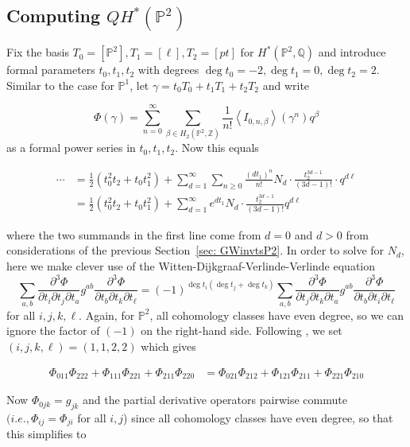 \documentclass{amsart}
\newcommand{\PP}{\mathbb{P}}\newcommand{\A}{\mathbb{A}}\newcommand{\Z}{\mathbb{Z}}\newcommand{\C}{\mathbb{C}}\newcommand{\N}{\mathbb{N}}\newcommand{\T}{\mathbb{T}}
\newcommand{\Q}{\mathbb{Q}}
\begin{document}





     
\subsection{Computing $QH^*(\PP^2)$}
\label{sec: 4.5}
Fix the basis $T_0 = [\PP^2], T_1=[\ell], T_2=[pt]$ for $H^*(\PP^2, \Q)$ and introduce formal parameters $t_0, t_1, t_2$ with degrees $\deg t_0 = -2, \deg t_1 = 0, \deg t_2 = 2$. Similar to the case for $\PP^1$, let $\gamma = t_0T_0 + t_1T_1 + t_2T_2$ and write

\[ \Phi(\gamma) = \sum_{n=0}^\infty \sum_{\beta\in H_2(\PP^2,\Z)} \frac{1}{n!} \left<I_{0,n,\beta}\right>(\gamma^n) q^\beta \] as a formal power series in $t_0, t_1, t_2$. Now this equals

\begin{align*}
\cdots &= \frac{1}{2}( t_0^2 t_2 + t_0 t_1^2 ) + \sum_{d=1}^\infty \sum_{n\geq 0} \frac{(dt_1)^n}{n!} N_d \cdot \frac{t_2^{3d-1}}{(3d-1)!} \cdot q^{d\ell}\\
&= \frac{1}{2}( t_0^2 t_2 + t_0 t_1^2 ) + \sum_{d=1}^\infty e^{dt_1} N_d \cdot \frac{ t_2^{3d-1}}{(3d-1)!}q^{d\ell} \end{align*} 

where the two summands in the first line come from $d=0$ and $d>0$ from considerations of the previous Section~\ref{sec: GWinvtsP2}. In order to solve for $N_d$, here we make clever use of the Witten-Dijkgraaf-Verlinde-Verlinde equation \[ \sum_{a,b} \frac{ \partial^3 \Phi}{\partial t_i \partial t_j \partial t_a} g^{ab} \frac{ \partial^3 \Phi }{\partial t_b \partial t_k \partial t_\ell} = (-1)^{\deg t_i (\deg t_j + \deg t_k)} \sum_{a,b} \frac{ \partial^3 \Phi}{\partial t_j \partial t_k \partial t_a} g^{ab} \frac{ \partial^3 \Phi}{\partial t_b \partial t_i \partial t_\ell} \] for all $i,j,k,\ell$. Again, for $\PP^2$, all cohomology classes have even degree, so we can ignore the factor of $(-1)$ on the right-hand side. Following \cite{coxkatxMSAG}, we set $(i,j,k,\ell) = (1,1,2,2)$ which gives

\begin{align*}
    \Phi_{011}\Phi_{222} + \Phi_{111}\Phi_{221} + \Phi_{211}\Phi_{220} &= \Phi_{021}\Phi_{212} + \Phi_{121}\Phi_{211} + \Phi_{221}\Phi_{210}
\end{align*}

Now $\Phi_{0jk} = g_{jk}$ and the partial derivative operators pairwise commute $(i.e., \Phi_{ij}=\Phi_{ji}$ for all $i,j$) since all cohomology classes have even degree, so that this simplifies to 
\end{document}

